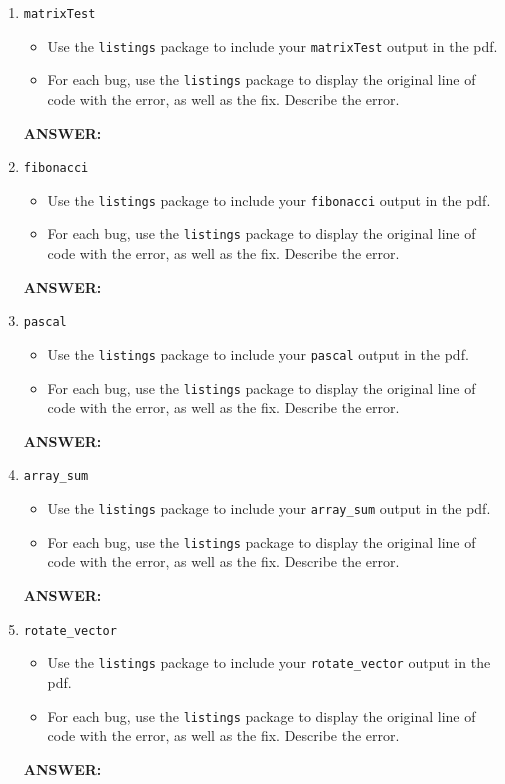 \begin{enumerate}
    \item \texttt{matrixTest}
    \begin{itemize}
        \item Use the \texttt{listings} package to include your \texttt{matrixTest} output in the pdf.
        \item For each bug, use the \texttt{listings} package to display the original line of code with the error, as well as the fix.  Describe the error.            
    \end{itemize}
    \textbf{ANSWER:} %

    \item \texttt{fibonacci}
    \begin{itemize}
        \item Use the \texttt{listings} package to include your \texttt{fibonacci} output in the pdf.
        \item For each bug, use the \texttt{listings} package to display the original line of code with the error, as well as the fix.  Describe the error.
    \end{itemize}
    \textbf{ANSWER:} %

    \item \texttt{pascal}
    \begin{itemize}
        \item Use the \texttt{listings} package to include your \texttt{pascal} output in the pdf.
        \item For each bug, use the \texttt{listings} package to display the original line of code with the error, as well as the fix.  Describe the error.
    \end{itemize}
    \textbf{ANSWER:} %

    \item \texttt{array\_sum}
    \begin{itemize}
        \item Use the \texttt{listings} package to include your \texttt{array\_sum} output in the pdf.
        \item For each bug, use the \texttt{listings} package to display the original line of code with the error, as well as the fix.  Describe the error.
    \end{itemize}
    \textbf{ANSWER:} %

    \item \texttt{rotate\_vector}
    \begin{itemize}
        \item Use the \texttt{listings} package to include your \texttt{rotate\_vector} output in the pdf.
        \item For each bug, use the \texttt{listings} package to display the original line of code with the error, as well as the fix.  Describe the error.
    \end{itemize}
    \textbf{ANSWER:} %
    
\end{enumerate}
